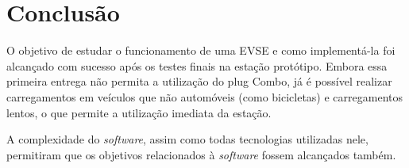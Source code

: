 \chapter{Conclusão}
\label{stateofart:conclusion}

  O objetivo de estudar o funcionamento de uma \ac{EVSE} e como implementá-la foi alcançado com sucesso após os testes finais na estação protótipo. Embora essa primeira entrega não permita a utilização do plug Combo, já é possível realizar carregamentos em veículos que não automóveis (como bicicletas) e carregamentos lentos, o que permite a utilização imediata da estação.

  A complexidade do \textit{software}, assim como todas tecnologias utilizadas nele, permitiram que os objetivos relacionados à \textit{software} fossem alcançados também.
  